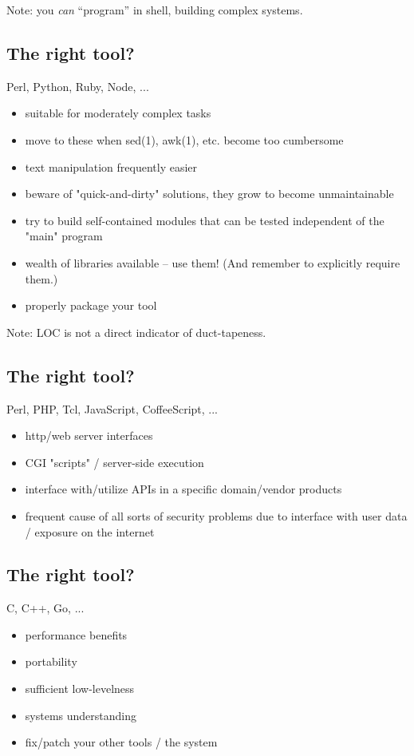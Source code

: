 \documentclass[xga]{xdvislides}
\begin{document}
Note: you {\em can} ``program'' in shell, building complex
systems.


\subsection{The right tool?}
Perl, Python, Ruby, Node, ... \\

\begin{itemize}
	\item suitable for moderately complex tasks
	\item move to these when sed(1), awk(1), etc. become too cumbersome
	\item text manipulation frequently easier
	\item beware of "quick-and-dirty" solutions, they grow to become
		unmaintainable
	\item try to build self-contained modules that can be tested independent of
		the "main" program
	\item wealth of libraries available -- use them! (And remember to explicitly
		require them.)
	\item properly package your tool
\end{itemize}

Note: LOC is not a direct indicator of duct-tapeness.

\subsection{The right tool?}
Perl, PHP, Tcl, JavaScript, CoffeeScript, ... \\

\begin{itemize}
	\item http/web server interfaces
	\item CGI "scripts" / server-side execution
	\item interface with/utilize APIs in a specific domain/vendor products
	\item frequent cause of all sorts of security problems due to interface with
		user data / exposure on the internet
\end{itemize}

\subsection{The right tool?}
C, C++, Go, ... \\

\begin{itemize}
	\item performance benefits
	\item portability
	\item sufficient low-levelness
	\item systems understanding
	\item fix/patch your other tools / the system
\end{itemize}
\end{document}
